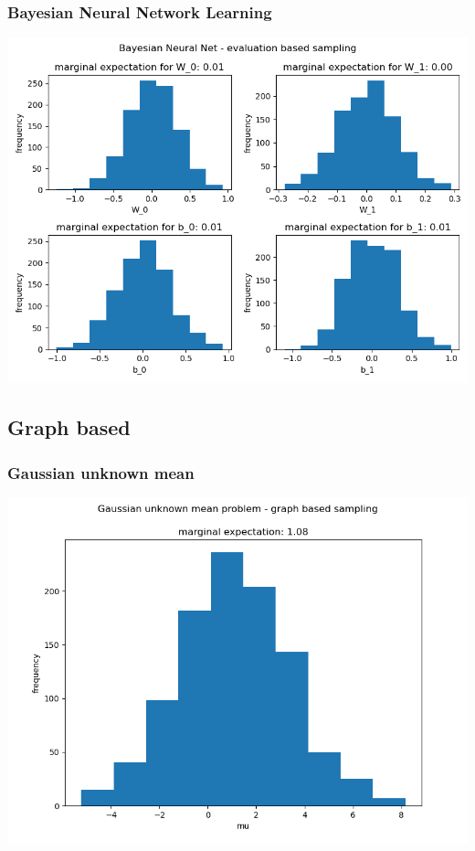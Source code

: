 \documentclass[10pt]{homeworg}
\begin{document}
\subsubsection{Bayesian Neural Network Learning}
\begin{center}
\includegraphics[scale=0.5]{figures/evaluation_4}
\end{center}


\subsection{Graph based}
\subsubsection{Gaussian unknown mean}
\begin{center}
\includegraphics[scale=0.5]{figures/graph_1.png}
\end{center}
\end{document}
